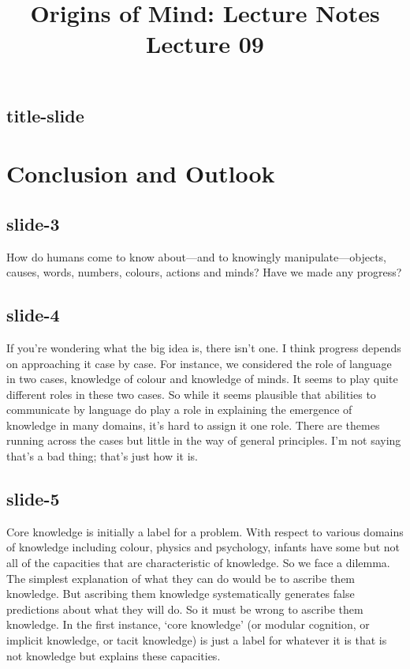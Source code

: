 \documentclass[12pt,\papersize]{extarticle}
\begin{document}
\setlength\footnotesep{1em}






\title {Origins of Mind: Lecture Notes \\ Lecture 09}
 
\maketitle
 
 
\subsection{title-slide}
 
\section{Conclusion and Outlook}
 
 
\subsection{slide-3}
How do humans come to know about---and to knowingly manipulate---objects, causes, words, numbers, colours, actions and minds?
Have we made any progress?
 
 
\subsection{slide-4}
If you're wondering what the big idea is, there isn't one.
I think progress depends on approaching it case by case.
For instance, we considered the role of language in two cases, knowledge of colour and knowledge of minds.
It seems to play quite different roles in these two cases.
So while it seems plausible that abilities to communicate by language do play a role in explaining the emergence of knowledge in many domains, it's hard to assign it one role.
There are themes running across the cases but little in the way of general principles.
I'm not saying that's a bad thing; that's just how it is.
 
 
\subsection{slide-5}
Core knowledge is initially a label for a problem.
With respect to various domains of knowledge including colour, physics and psychology, infants have some but not all of the capacities that are characteristic of knowledge.
So we face a dilemma.
The simplest explanation of what they can do would be to ascribe them knowledge.
But ascribing them knowledge systematically generates false predictions about what they will do.
So it must be wrong to ascribe them knowledge.
In the first instance, ‘core knowledge’ (or modular cognition, or implicit knowledge, or tacit knowledge) is just a label for whatever it is that is not knowledge but explains these capacities.
 
\end{document}

